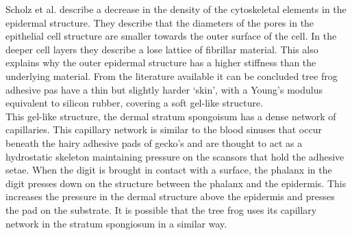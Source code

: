 \qquad Scholz et al. describe a decrease in the density of the cytoskeletal elements in the epidermal structure. They describe that the diameters of the pores in the epithelial cell structure are smaller towards the outer surface of the cell. In the deeper cell layers they describe a lose lattice of fibrillar material. This also explains why the outer epidermal structure has a higher stiffness than the underlying material. From the literature available it can be concluded tree frog adhesive pas have a thin but slightly harder ‘skin’, with a Young’s modulus equivalent to silicon rubber, covering a soft gel-like structure.\\ 

\qquad This gel-like structure, the dermal stratum spongoisum has a dense network of capillaries. This capillary network is similar to the blood sinuses that occur beneath the hairy adhesive pads of gecko's and are thought to act as a hydrostatic skeleton maintaining pressure on the scansors that hold the adhesive setae. When the digit is brought in contact with a surface, the phalanx in the digit presses down on the structure between the phalanx and the epidermis. This increases the pressure in the dermal structure above the epidermis and presses the pad on the substrate. It is possible that the tree frog uses its capillary network in the stratum spongiosum in a similar way.\\ 

